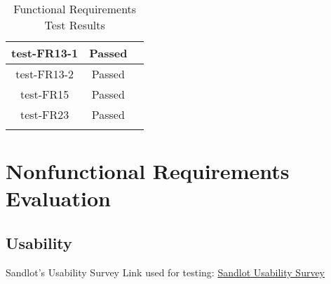 \documentclass[12pt, titlepage]{article}
\begin{document}
\begin{longtable}{|c|c|c|}
  \hline
  test-FR13-1 & Passed & \\
  \hline
  test-FR13-2 & Passed & \\
  \hline
  test-FR15 & Passed & \\
  \hline
  test-FR23 & Passed & \\
  \hline
  \caption{Functional Requirements Test Results}
\end{longtable}


\section{Nonfunctional Requirements Evaluation}

\subsection{Usability}

Sandlot's Usability Survey Link used for testing: \href{https://forms.office.com/Pages/ResponsePage.aspx?id=B2M3RCm0rUKMJSjNSW9HcodvkeIlB8lOjrmyIWuVT7dUQ0hBNFRVTjFHWVhITDIzSklZRDRYTVZRMi4u}{Sandlot Usability Survey}
\end{document}
